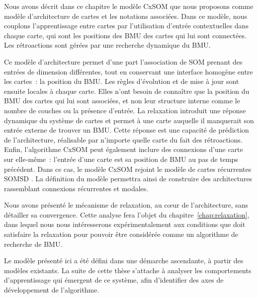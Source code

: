 \documentclass[../main]{subfiles}
\begin{document}
Nous avons décrit dans ce chapitre le modèle CxSOM que nous proposons comme modèle d'architecture de cartes et les notations associées.
Dans ce modèle, nous couplons l'apprentissage entre cartes par l'utilisation d'entrée contextuelles dans chaque carte, qui sont les positions des BMU des cartes qui lui sont connectées. Les rétroactions sont gérées par une recherche dynamique du BMU.

Ce modèle d'architecture permet d'une part l'association de SOM prenant des entrées de dimension différentes, tout en conservant une interface homogène entre les cartes~: la position du BMU.
Les règles d'évolution et de mise à jour sont ensuite locales à chaque carte. Elles n'ont besoin de connaître que la position du BMU des cartes qui lui sont associées, et non leur structure interne comme le nombre de couches ou la présence d'entrée. La relaxation introduit une réponse dynamique du système de cartes et permet à une carte auquelle il manquerait son entrée externe de trouver un BMU. Cette réponse est une capacité de prédiction de l'architecture, réalisable par n'importe quelle carte du fait des rétroactions.
Enfin, l'algorithme CxSOM peut également inclure des connexions d'une carte sur elle-même~: l'entrée d'une carte est sa position de BMU au pas de temps précédent. Dans ce cas, le modèle CxSOM rejoint le modèle de cartes récurrentes SOMSD \parencite{hammer_recursive_2004}. La définition du modèle permettra ainsi de construire des architectures rassemblant connexions récurrentes et modales.

Nous avons présenté le mécanisme de relaxation, au c\oe{}ur de l'architecture, sans détailler sa convergence. Cette analyse fera l'objet du chapitre~\ref{chap:relaxation}, dans lequel nous nous intéresserons expérimentalement aux conditions que doit satisfaire la relaxation pour pouvoir être considérée comme un algorithme de recherche de BMU.

Le modèle présenté ici a été défini dans une démarche ascendante, à partir des modèles existants.
La suite de cette thèse s'attache à analyser les comportements d'apprentissage qui émergent de ce système, afin d'identifier des axes de développement de l'algorithme.
\end{document}
